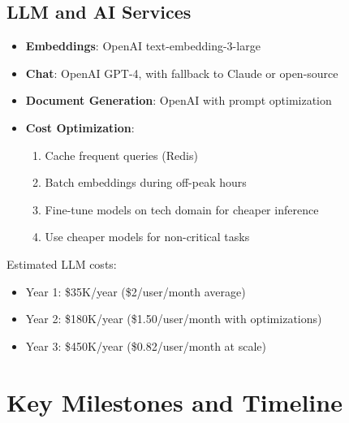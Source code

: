 \documentclass{report}
\begin{document}
\subsection{LLM and AI Services}

\begin{itemize}
    \item \textbf{Embeddings}: OpenAI text-embedding-3-large
    \item \textbf{Chat}: OpenAI GPT-4, with fallback to Claude or open-source
    \item \textbf{Document Generation}: OpenAI with prompt optimization
    \item \textbf{Cost Optimization}:
    \begin{enumerate}
        \item Cache frequent queries (Redis)
        \item Batch embeddings during off-peak hours
        \item Fine-tune models on tech domain for cheaper inference
        \item Use cheaper models for non-critical tasks
    \end{enumerate}
\end{itemize}

Estimated LLM costs:
\begin{itemize}
    \item Year 1: \$35K/year (\$2/user/month average)
    \item Year 2: \$180K/year (\$1.50/user/month with optimizations)
    \item Year 3: \$450K/year (\$0.82/user/month at scale)
\end{itemize}

\section{Key Milestones and Timeline}
\end{document}
